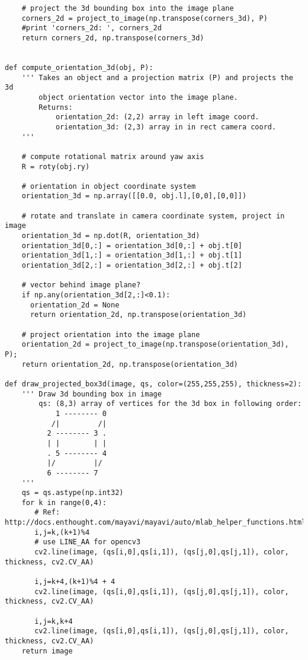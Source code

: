\begin{verbatim}
    # project the 3d bounding box into the image plane
    corners_2d = project_to_image(np.transpose(corners_3d), P)
    #print 'corners_2d: ', corners_2d
    return corners_2d, np.transpose(corners_3d)


def compute_orientation_3d(obj, P):
    ''' Takes an object and a projection matrix (P) and projects the 3d
        object orientation vector into the image plane.
        Returns:
            orientation_2d: (2,2) array in left image coord.
            orientation_3d: (2,3) array in in rect camera coord.
    '''
    
    # compute rotational matrix around yaw axis
    R = roty(obj.ry)
   
    # orientation in object coordinate system
    orientation_3d = np.array([[0.0, obj.l],[0,0],[0,0]])
    
    # rotate and translate in camera coordinate system, project in image
    orientation_3d = np.dot(R, orientation_3d)
    orientation_3d[0,:] = orientation_3d[0,:] + obj.t[0]
    orientation_3d[1,:] = orientation_3d[1,:] + obj.t[1]
    orientation_3d[2,:] = orientation_3d[2,:] + obj.t[2]
    
    # vector behind image plane?
    if np.any(orientation_3d[2,:]<0.1):
      orientation_2d = None
      return orientation_2d, np.transpose(orientation_3d)
    
    # project orientation into the image plane
    orientation_2d = project_to_image(np.transpose(orientation_3d), P);
    return orientation_2d, np.transpose(orientation_3d)

def draw_projected_box3d(image, qs, color=(255,255,255), thickness=2):
    ''' Draw 3d bounding box in image
        qs: (8,3) array of vertices for the 3d box in following order:
            1 -------- 0
           /|         /|
          2 -------- 3 .
          | |        | |
          . 5 -------- 4
          |/         |/
          6 -------- 7
    '''
    qs = qs.astype(np.int32)
    for k in range(0,4):
       # Ref: http://docs.enthought.com/mayavi/mayavi/auto/mlab_helper_functions.html
       i,j=k,(k+1)%4
       # use LINE_AA for opencv3
       cv2.line(image, (qs[i,0],qs[i,1]), (qs[j,0],qs[j,1]), color, thickness, cv2.CV_AA)

       i,j=k+4,(k+1)%4 + 4
       cv2.line(image, (qs[i,0],qs[i,1]), (qs[j,0],qs[j,1]), color, thickness, cv2.CV_AA)

       i,j=k,k+4
       cv2.line(image, (qs[i,0],qs[i,1]), (qs[j,0],qs[j,1]), color, thickness, cv2.CV_AA)
    return image
\end{verbatim}
\newpage
